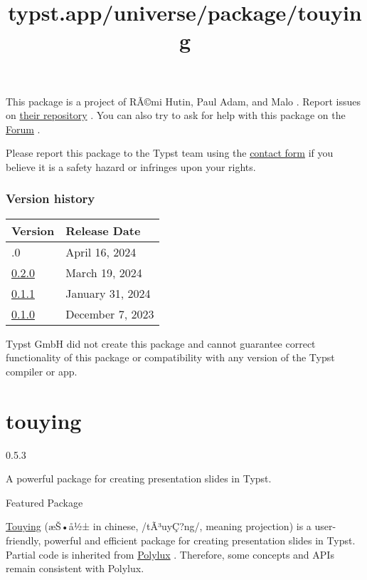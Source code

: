 This package is a project of RÃ©mi Hutin, Paul Adam, and Malo . Report
issues on \href{https://github.com/pauladam94/curryst}{their repository}
. You can also try to ask for help with this package on the
\href{https://forum.typst.app}{Forum} .

Please report this package to the Typst team using the
\href{https://typst.app/contact}{contact form} if you believe it is a
safety hazard or infringes upon your rights.

\label{versions}
\subsubsection{Version history}\label{version-history}

\begin{longtable}[]{@{}ll@{}}
\toprule\noalign{}
Version & Release Date \\
\midrule\noalign{}
\endhead
\bottomrule\noalign{}
\endlastfoot
0.3.0 & April 16, 2024 \\
\href{https://typst.app/universe/package/curryst/0.2.0/}{0.2.0} & March
19, 2024 \\
\href{https://typst.app/universe/package/curryst/0.1.1/}{0.1.1} &
January 31, 2024 \\
\href{https://typst.app/universe/package/curryst/0.1.0/}{0.1.0} &
December 7, 2023 \\
\end{longtable}

Typst GmbH did not create this package and cannot guarantee correct
functionality of this package or compatibility with any version of the
Typst compiler or app.


\title{typst.app/universe/package/touying}

\label{banner}
\section{touying}\label{touying}

{ 0.5.3 }

A powerful package for creating presentation slides in Typst.

{ } Featured Package

\label{readme}
\href{https://github.com/touying-typ/touying}{Touying} (æŠ•å½± in
chinese, /tÃ³uyÇ?ng/, meaning projection) is a user-friendly, powerful
and efficient package for creating presentation slides in Typst. Partial
code is inherited from
\href{https://github.com/andreasKroepelin/polylux}{Polylux} . Therefore,
some concepts and APIs remain consistent with Polylux.

